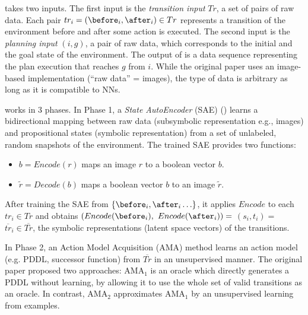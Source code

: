 \latentplanner takes two inputs.
The first input is the \emph{transition input} $Tr$, a set of pairs of raw data.
Each pair $tr_i=(\before_i, \after_i) \in Tr$ represents a transition of the environment before and after some action is executed.
The second input is the \emph{planning input} $(i, g)$, a pair of raw data, which corresponds to the initial and the goal state of the environment.
The output of \latentplanner is a data sequence representing the plan execution that reaches $g$ from $i$.
While the original paper uses an image-based implementation (``raw data'' = images),
the type of data is arbitrary as long as it is compatible to NNs.


\latentplanner works in 3 phases.
In Phase 1, a \emph{State AutoEncoder} (SAE) () learns a bidirectional mapping between raw data (subsymbolic representation e.g., images)
 and propositional states (symbolic representation) from a set of unlabeled, random snapshots of the environment.
The trained SAE provides two functions:
\begin{itemize} %
\setlength{\itemsep}{-0.3em}
\item $b=Encode(r)$ maps an image  $r$ to a boolean vector $b$.
\item $\tilde{r}=Decode(b)$ maps a boolean vector $b$ to an image $\tilde{r}$.
\end{itemize}
After training the SAE from $\braces{\before_i, \after_i\ldots}$,
it applies $Encode$ to each $tr_i \in Tr$ and obtains $(Encode(\before_i),$ $Encode(\after_i))=$ $(s_i,t_i)=$ $\overline{tr}_i\in \overline{Tr}$,
the symbolic representations (latent space vectors) of the transitions.

In Phase 2, an Action Model Acquisition (AMA) method learns an action model (e.g. PDDL, successor function) from $\overline{Tr}$ in an unsupervised manner.
The original paper proposed two approaches: AMA$_1$ is an oracle which directly generates a PDDL without learning,
by allowing it to use the whole set of valid transitions as an oracle.
In contrast, AMA$_2$ approximates AMA$_1$ by an unsupervised learning from examples.

